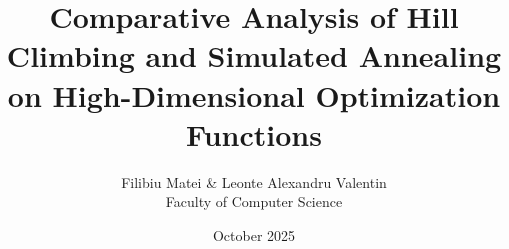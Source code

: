 \title{
  \textbf{Comparative Analysis of Hill Climbing and Simulated Annealing}\\
  \textbf{on High-Dimensional Optimization Functions}
}
\author{Filibiu Matei \& Leonte Alexandru Valentin\\
Faculty of Computer Science}
\date{October 2025}